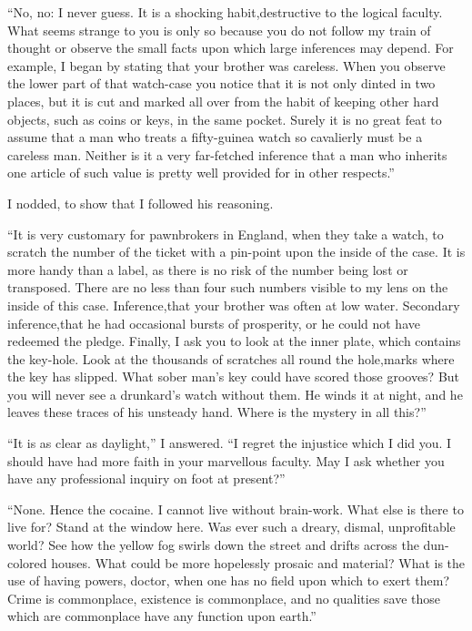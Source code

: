 \documentclass[12pt,english,oneside]{book}
\begin{document}
{}``No, no: I never guess. It is a shocking habit,\mdsh{---}destructive
to the logical faculty. What seems strange to you is only so because
you do not follow my train of thought or observe the small facts upon
which large inferences may depend. For example, I began by stating
that your brother was careless. When you observe the lower part of
that watch-case you notice that it is not only dinted in two places,
but it is cut and marked all over from the habit of keeping other
hard objects, such as coins or keys, in the same pocket. Surely it
is no great feat to assume that a man who treats a fifty-guinea watch
so cavalierly must be a careless man. Neither is it a very far-fetched
inference that a man who inherits one article of such value is pretty
well provided for in other respects.''

I nodded, to show that I followed his reasoning.

{}``It is very customary for pawnbrokers in England, when they take
a watch, to scratch the number of the ticket with a pin-point upon
the inside of the case. It is more handy than a label, as there is
no risk of the number being lost or transposed. There are no less
than four such numbers visible to my lens on the inside of this case.
Inference,\mdsh{---}that your brother was often at low water. Secondary
inference,\mdsh{---}that he had occasional bursts of prosperity,
or he could not have redeemed the pledge. Finally, I ask you to look
at the inner plate, which contains the key-hole. Look at the thousands
of scratches all round the hole,\mdsh{---}marks where the key has
slipped. What sober man's key could have scored those grooves? But
you will never see a drunkard's watch without them. He winds it at
night, and he leaves these traces of his unsteady hand. Where is the
mystery in all this?''

{}``It is as clear as daylight,'' I answered. {}``I regret the
injustice which I did you. I should have had more faith in your marvellous
faculty. May I ask whether you have any professional inquiry on foot
at present?''

{}``None. Hence the cocaine. I cannot live without brain-work. What
else is there to live for? Stand at the window here. Was ever such
a dreary, dismal, unprofitable world? See how the yellow fog swirls
down the street and drifts across the dun-colored houses. What could
be more hopelessly prosaic and material? What is the use of having
powers, doctor, when one has no field upon which to exert them? Crime
is commonplace, existence is commonplace, and no qualities save those
which are commonplace have any function upon earth.''
\end{document}
